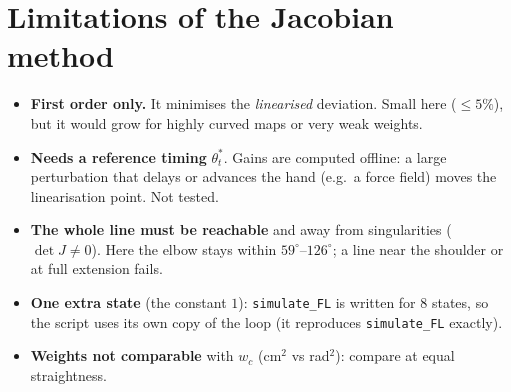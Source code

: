 \documentclass[11pt,a4paper]{article}
\begin{document}
\section{Limitations of the Jacobian method}
\begin{itemize}\setlength\itemsep{1pt}
\item \textbf{First order only.} It minimises the \emph{linearised} deviation. Small here
($\le5\%$), but it would grow for highly curved maps or very weak weights.
\item \textbf{Needs a reference timing} $\theta^*_t$. Gains are computed offline: a large
perturbation that delays or advances the hand (e.g.\ a force field) moves the linearisation point.
Not tested.
\item \textbf{The whole line must be reachable} and away from singularities ($\det J\neq0$).
Here the elbow stays within $59^\circ$--$126^\circ$; a line near the shoulder or at full extension fails.
\item \textbf{One extra state} (the constant $1$): \texttt{simulate\_FL} is written for 8 states,
so the script uses its own copy of the loop (it reproduces \texttt{simulate\_FL} exactly).
\item \textbf{Weights not comparable} with $w_c$ (cm$^2$ vs rad$^2$): compare at equal straightness.
\end{itemize}
\end{document}
